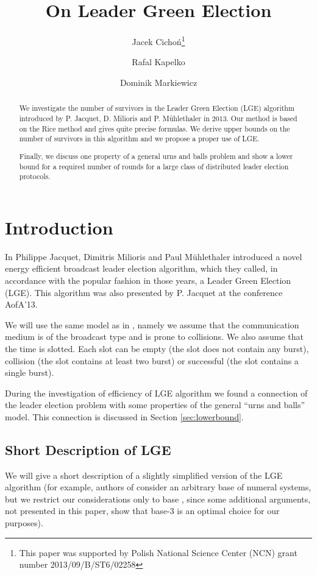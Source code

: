 \documentclass[proceedings]{dmtcs}
\title[On Leader Green Election]{On Leader Green Election}
\author[J. Cicho{\'n}, R. Kapelko and D. Markiewicz]{Jacek Cicho{\'n}\thanks{This paper was supported by Polish National Science Center (NCN) grant number 2013/09/B/ST6/02258}
\and Rafal Kapelko \and Dominik Markiewicz}
\begin{document}
\label{firstpage}
\maketitle
\begin{abstract}
We investigate the number of survivors in the Leader Green Election (LGE) algorithm introduced by
P. Jacquet, D. Milioris and P. M{\"u}hlethaler in 2013.
Our method is based on the Rice method and gives quite precise formulas. 
We derive upper bounds on the number of survivors in this algorithm and we propose a proper use of LGE.
\par 
Finally, we discuss one property of a general urns and balls problem and show a lower bound for a required number of rounds for a large class of distributed leader election protocols.
\par
\end{abstract}

\section{Introduction}


In \cite{DBLP:conf/mascots/JacquetMM13} Philippe Jacquet, Dimitris Milioris and Paul M{\"u}hlethaler introduced 
a novel energy efficient broadcast leader election algorithm, which they called,
in accordance with the popular fashion in those years, 
a Leader Green Election (LGE). 
This algorithm was also presented by P. Jacquet at the conference AofA'13.
\par
We will use the same model as in \cite{DBLP:conf/mascots/JacquetMM13}, namely we assume that
the communication medium is of the broadcast type and is
prone to collisions. We also assume that
the time is slotted. Each slot can be empty (the slot does not contain any burst),
collision (the slot contains at least two burst) or successful (the slot contains a single burst).
\par
During the investigation of efficiency of LGE algorithm we found a connection of the leader election problem with some  properties of the general "`urns and balls"' model. This connection is discussed in Section \ref{sec:lowerbound}.

\subsection{Short Description of LGE}

We will give a short description of a slightly simplified version of the LGE algorithm (for example,
authors of \cite{DBLP:conf/mascots/JacquetMM13} consider an arbitrary base of numeral systems, but we restrict our considerations only to base , since some additional arguments, not presented in this paper, show that base-3 is an optimal choice for our purposes).\par
\end{document}
